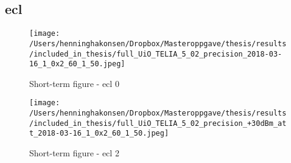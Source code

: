 \documentclass[USenglish]{ifimaster}  %
\begin{document}
\subsection{\acrshort{ecl}} \label{ssection:ecllevel}
\begin{figure}[H]
  \centering
  \texttt{[image: /Users/henninghakonsen/Dropbox/Masteroppgave/thesis/results/included\_in\_thesis/full\_UiO\_TELIA\_5\_02\_precision\_2018-03-16\_1\_0x2\_60\_1\_50.jpeg]}
  \caption{Short-term figure - \acrshort{ecl} 0}
  \label{figure:1x60_UIO_TELIA_ECL_0}
\end{figure}

\begin{figure}[H]
  \centering
  \texttt{[image: /Users/henninghakonsen/Dropbox/Masteroppgave/thesis/results/included\_in\_thesis/full\_UiO\_TELIA\_5\_02\_precision\_+30dBm\_att\_2018-03-16\_1\_0x2\_60\_1\_50.jpeg]}
  \caption{Short-term figure - \acrshort{ecl} 2}
  \label{figure:1x60_UIO_TELIA_ECL_2}
\end{figure}
\end{document}
